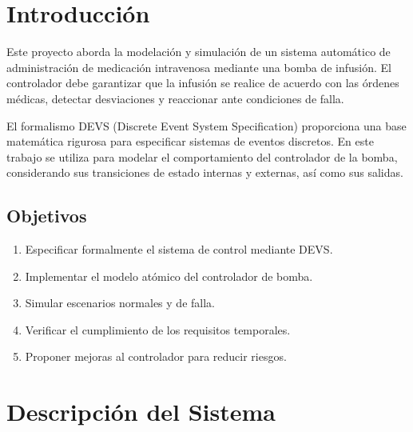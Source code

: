 \documentclass[12pt,a4paper,oneside]{report}
\begin{document}
\tableofcontents
\newpage

\chapter{Introducción}

Este proyecto aborda la modelación y simulación de un sistema automático de administración de medicación intravenosa mediante una bomba de infusión. El controlador debe garantizar que la infusión se realice de acuerdo con las órdenes médicas, detectar desviaciones y reaccionar ante condiciones de falla.

El formalismo DEVS (Discrete Event System Specification) proporciona una base matemática rigurosa para especificar sistemas de eventos discretos. En este trabajo se utiliza para modelar el comportamiento del controlador de la bomba, considerando sus transiciones de estado internas y externas, así como sus salidas.

\section{Objetivos}

\begin{enumerate}
    \item Especificar formalmente el sistema de control mediante DEVS.
    \item Implementar el modelo atómico del controlador de bomba.
    \item Simular escenarios normales y de falla.
    \item Verificar el cumplimiento de los requisitos temporales.
    \item Proponer mejoras al controlador para reducir riesgos.
\end{enumerate}

\chapter{Descripción del Sistema}
\end{document}
